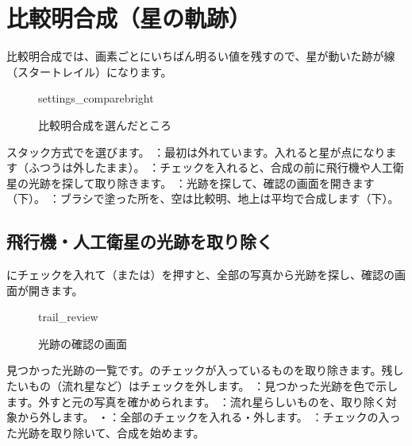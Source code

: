 \clearpage
\section{比較明合成（星の軌跡）}\label{sec:startrail}

比較明合成では、画素ごとにいちばん明るい値を残すので、星が動いた跡が線（スタートレイル）になります。

\begin{figure}[H]
\centering
\begin{screenshot}[0.46\linewidth]{settings_comparebright}
\end{screenshot}
\caption{比較明合成を選んだところ}
\end{figure}

\begin{callouts}
 スタック方式でを選びます。
 ：最初は外れています。入れると星が点になります（ふつうは外したまま）。
 ：チェックを入れると、合成の前に飛行機や人工衛星の光跡を探して取り除きます。
 ：光跡を探して、確認の画面を開きます（下）。
 ：ブラシで塗った所を、空は比較明、地上は平均で合成します（下）。
\end{callouts}

\subsection{飛行機・人工衛星の光跡を取り除く}

にチェックを入れて（または）を押すと、全部の写真から光跡を探し、確認の画面が開きます。

\begin{figure}[H]
\centering
\begin{screenshot}{trail_review}
\end{screenshot}
\caption{光跡の確認の画面}
\end{figure}

\begin{callouts}
 見つかった光跡の一覧です。のチェックが入っているものを取り除きます。残したいもの（流れ星など）はチェックを外します。
 ：見つかった光跡を色で示します。外すと元の写真を確かめられます。
 ：流れ星らしいものを、取り除く対象から外します。
 ・：全部のチェックを入れる・外します。
 ：チェックの入った光跡を取り除いて、合成を始めます。
\end{callouts}

